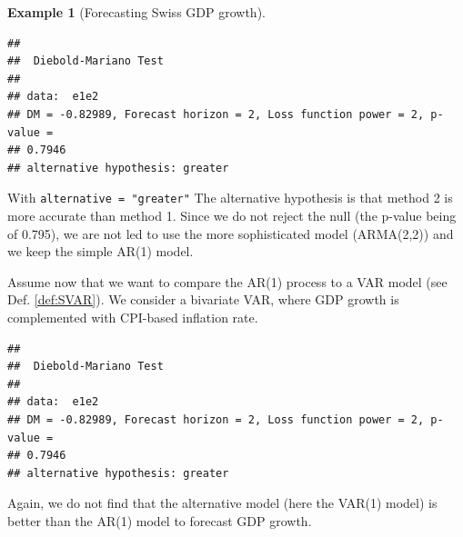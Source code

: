 \documentclass[
  12pt,
]{book}
\newenvironment{Shaded}{\begin{snugshade}}{\end{snugshade}}
\newcommand{\AttributeTok}[1]{\textcolor[rgb]{0.77,0.63,0.00}{#1}}
\newcommand{\ConstantTok}[1]{\textcolor[rgb]{0.00,0.00,0.00}{#1}}
\newcommand{\ControlFlowTok}[1]{\textcolor[rgb]{0.13,0.29,0.53}{\textbf{#1}}}
\newcommand{\DecValTok}[1]{\textcolor[rgb]{0.00,0.00,0.81}{#1}}
\newcommand{\FloatTok}[1]{\textcolor[rgb]{0.00,0.00,0.81}{#1}}
\newcommand{\FunctionTok}[1]{\textcolor[rgb]{0.00,0.00,0.00}{#1}}
\newcommand{\NormalTok}[1]{#1}
\newcommand{\OtherTok}[1]{\textcolor[rgb]{0.56,0.35,0.01}{#1}}
\newcommand{\SpecialCharTok}[1]{\textcolor[rgb]{0.00,0.00,0.00}{#1}}
\newcommand{\StringTok}[1]{\textcolor[rgb]{0.31,0.60,0.02}{#1}}
\theoremstyle{definition}
\theoremstyle{definition}
\newtheorem{example}{Example}[chapter]
\theoremstyle{definition}
\theoremstyle{definition}
\theoremstyle{remark}
\begin{document}
\begin{example}[Forecasting Swiss GDP growth]
\begin{verbatim}
## 
##  Diebold-Mariano Test
## 
## data:  e1e2
## DM = -0.82989, Forecast horizon = 2, Loss function power = 2, p-value =
## 0.7946
## alternative hypothesis: greater
\end{verbatim}

With \texttt{alternative\ =\ "greater"} The alternative hypothesis is that method 2 is more accurate than method 1. Since we do not reject the null (the p-value being of 0.795), we are not led to use the more sophisticated model (ARMA(2,2)) and we keep the simple AR(1) model.

Assume now that we want to compare the AR(1) process to a VAR model (see Def. \ref{def:SVAR}). We consider a bivariate VAR, where GDP growth is complemented with CPI-based inflation rate.

\begin{Shaded}
\end{Shaded}

\begin{verbatim}
## 
##  Diebold-Mariano Test
## 
## data:  e1e2
## DM = -0.82989, Forecast horizon = 2, Loss function power = 2, p-value =
## 0.7946
## alternative hypothesis: greater
\end{verbatim}

Again, we do not find that the alternative model (here the VAR(1) model) is better than the AR(1) model to forecast GDP growth.
\end{example}
\end{document}
